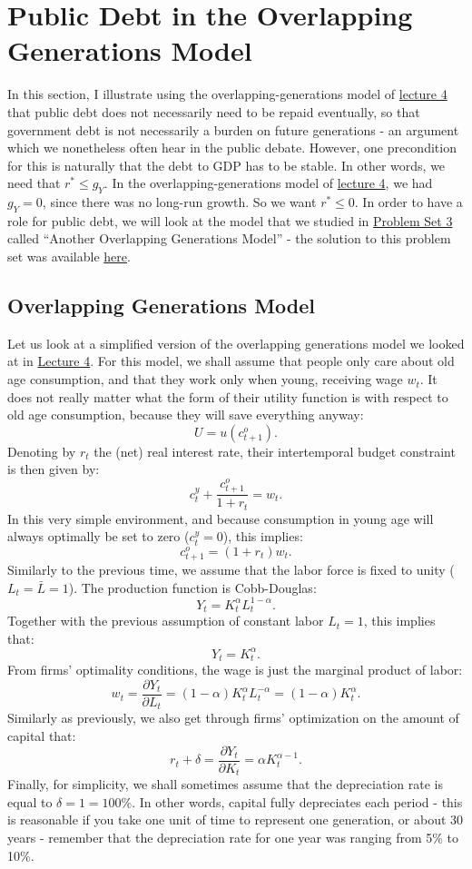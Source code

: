 \documentclass[]{book}
\theoremstyle{definition}
\theoremstyle{definition}
\theoremstyle{definition}
\theoremstyle{remark}
\begin{document}
\section{Public Debt in the Overlapping Generations
Model}\label{public-debt-in-the-overlapping-generations-model}

In this section, I illustrate using the overlapping-generations model of
\href{lecture4.html}{lecture 4} that public debt does not necessarily
need to be repaid eventually, so that government debt is not necessarily
a burden on future generations - an argument which we nonetheless often
hear in the public debate. However, one precondition for this is
naturally that the debt to GDP has to be stable. In other words, we need
that \(r^{*} \leq g_Y\). In the overlapping-generations model of
\href{lecture4.html}{lecture 4}, we had \(g_Y = 0\), since there was no
long-run growth. So we want \(r^{*} \leq 0\). In order to have a role
for public debt, we will look at the model that we studied in
\href{pset3.html}{Problem Set 3} called ``Another Overlapping
Generations Model'' - the solution to this problem set was available
\href{pset3-sol.html}{here}.

\subsection{Overlapping Generations
Model}\label{overlapping-generations-model}

Let us look at a simplified version of the overlapping generations model
we looked at in \href{lecture4.html}{Lecture 4}. For this model, we
shall assume that people only care about old age consumption, and that
they work only when young, receiving wage \(w_{t}\). It does not really
matter what the form of their utility function is with respect to old
age consumption, because they will save everything anyway:
\[U=u(c_{t+1}^{o}).\] Denoting by \(r_t\) the (net) real interest rate,
their intertemporal budget constraint is then given by:
\[c_{t}^{y}+\frac{c_{t+1}^{o}}{1+r_t}=w_{t}.\] In this very simple
environment, and because consumption in young age will always optimally
be set to zero (\(c_{t}^{y}=0\)), this implies:
\[c_{t+1}^{o}=(1+r_t)w_{t}.\] Similarly to the previous time, we assume
that the labor force is fixed to unity (\(L_{t}=\bar{L}=1\)). The
production function is Cobb-Douglas:
\[Y_{t}=K_{t}^{\alpha}L_{t}^{1-\alpha}.\] Together with the previous
assumption of constant labor \(L_{t}=1\), this implies that:
\[Y_{t}=K_{t}^{\alpha}.\] From firms' optimality conditions, the wage is
just the marginal product of labor:
\[w_{t}=\frac{\partial Y_{t}}{\partial L_{t}}=(1-\alpha)K_{t}^{\alpha}L_{t}^{-\alpha}=(1-\alpha)K_{t}^{\alpha}.\]
Similarly as previously, we also get through firms' optimization on the
amount of capital that:
\[r_t+\delta=\frac{\partial Y_{t}}{\partial K_{t}}=\alpha K_{t}^{\alpha-1}.\]
Finally, for simplicity, we shall sometimes assume that the depreciation
rate is equal to \(\delta=1=100\%\). In other words, capital fully
depreciates each period - this is reasonable if you take one unit of
time to represent one generation, or about 30 years - remember that the
depreciation rate for one year was ranging from 5\% to 10\%.
\end{document}
